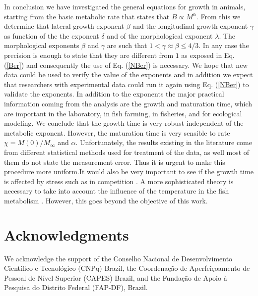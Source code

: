 In conclusion we have investigated the general  equations for growth in animals, starting from the basic metabolic rate that states that $B \propto M^{\alpha}$.  From this we determine that lateral growth exponent $\beta$ and the longitudinal growth exponent $\gamma$ as function of the the exponent $\delta$ and of the morphological exponent $\lambda$.  The morphological exponents $\beta$ and $\gamma$ are such that  $1 < \gamma \approx \beta \leq 4/3$. In any case the precision is enough to state that they are different from $1$ as exposed in Eq. (\ref{Ber}) and consequently the use of Eq. (\ref{NBer}) is necessary. We hope that new data could be used to verify the value of the exponents and in addition we expect that researchers  with experimental data could run it again using Eq. (\ref{NBer}) to validate the exponents. In addition to the exponents the major practical information coming from the analysis are the growth and maturation time, which are important in the laboratory, in fish farming, in fisheries, and for ecological modeling. We conclude that the growth time is very robust independent of the metabolic exponent. However, the maturation time is very sensible to rate $\chi=M(0)/M_{\infty}$ and $\alpha$.  Unfortunately, the  results existing in the literature come from different statistical methods used for treatment of the data, as well most of them do not state the measurement error.  Thus it is urgent to make this procedure more uniform.It would also be very important to see if the growth time is affected by stress such as in competition \cite{Barbosa17,Clerc10,Colombo12,Cunha09,Cunha11}.  A more sophisticated theory is necessary to take into account the influence of the temperature in the fish metabolism \cite{Clark99,Chabot16}. However, this goes beyond the objective of this work.

\section{Acknowledgments}

We acknowledge the support of the Conselho Nacional de Desenvolvimento Cient\'{i}fico e Tecnol\'{o}gico (CNPq) Brazil, the Coordena\c{c}\~{a}o de Aperfei\c{c}oamento de Pessoal de N\'{i}vel Superior (CAPES) Brazil, and the Funda\c{c}\~{a}o de Apoio \`{a} Pesquisa do Distrito Federal (FAP-DF), Brazil.

